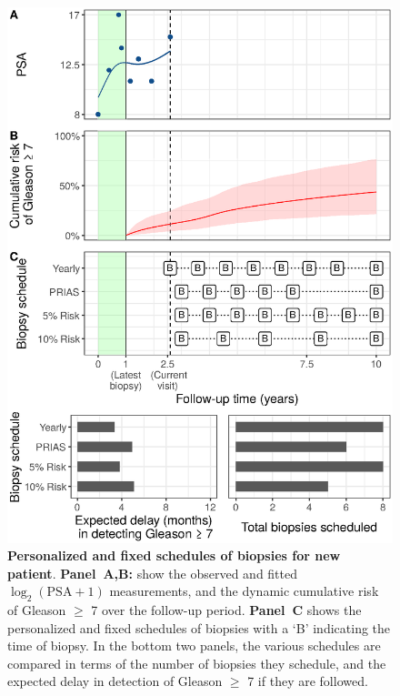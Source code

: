 \begin{figure}[!htb]
\centerline{\includegraphics[width=\columnwidth]{images/demo_pat1.eps}}
\caption{\textbf{Personalized and fixed schedules of biopsies for new patient}. \textbf{Panel~A,B:} show the observed and fitted $\log_2(\mbox{PSA} + 1)$ measurements, and the dynamic cumulative risk of Gleason $\geq$ 7 over the follow-up period. \textbf{Panel~C} shows the personalized and fixed schedules of biopsies with a `B' indicating the time of biopsy. In the bottom two panels, the various schedules are compared in terms of the number of biopsies they schedule, and the expected delay in detection of Gleason $\geq$ 7 if they are followed.}
\label{fig:demo_pat1}
\end{figure}
